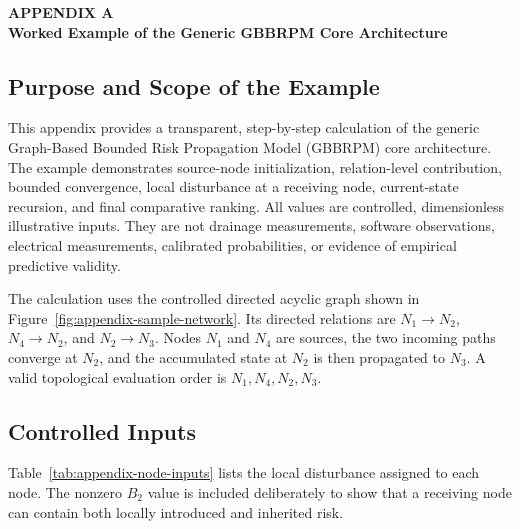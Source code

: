 \clearpage
\thispagestyle{empty}
\label{app:worked-example}
{}
\makeatletter
\providecommand*{\toclevel@appendixtitle}{2}
\providecommand*{\l@appendixtitle}{\@dottedtocline{1}{0em}{2.3em}}
\makeatother
{}

{
\centering
\textbf{APPENDIX A}\\
\textbf{Worked Example of the Generic GBBRPM Core Architecture}\par
}
\vspace{\baselineskip}

\subsection{Purpose and Scope of the Example}

This appendix provides a transparent, step-by-step calculation of the generic
Graph-Based Bounded Risk Propagation Model (GBBRPM) core architecture. The
example demonstrates source-node initialization, relation-level contribution,
bounded convergence, local disturbance at a receiving node, current-state
recursion, and final comparative ranking. All values are controlled,
dimensionless illustrative inputs. They are not drainage measurements,
software observations, electrical measurements, calibrated probabilities, or
evidence of empirical predictive validity.

The calculation uses the controlled directed acyclic graph shown in
Figure~\ref{fig:appendix-sample-network}. Its directed relations are
\(N_1\rightarrow N_2\), \(N_4\rightarrow N_2\), and
\(N_2\rightarrow N_3\). Nodes \(N_1\) and \(N_4\) are sources, the two
incoming paths converge at \(N_2\), and the accumulated state at \(N_2\) is
then propagated to \(N_3\). A valid topological evaluation order is
\(N_1,N_4,N_2,N_3\).



\subsection{Controlled Inputs}

Table~\ref{tab:appendix-node-inputs} lists the local disturbance assigned to
each node. The nonzero \(B_2\) value is included deliberately to show that a
receiving node can contain both locally introduced and inherited risk.

